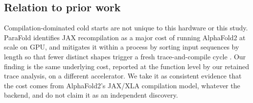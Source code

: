 \subsection{Relation to prior work}
\label{sec:prof-priorwork}

Compilation-dominated cold starts are not unique to this hardware or
this study. ParaFold identifies JAX recompilation as a major cost of
running AlphaFold2 at scale on GPU, and mitigates it within a process by
sorting input sequences by length so that fewer distinct shapes
trigger a fresh trace-and-compile cycle \citep{zhong2022parafold}. Our
finding is the same underlying cost, reported at the function level by
our retained trace analysis, on a different accelerator. We take it as consistent evidence that
the cost comes from AlphaFold2's JAX/XLA compilation model, whatever
the backend, and do not claim it as an independent discovery.
